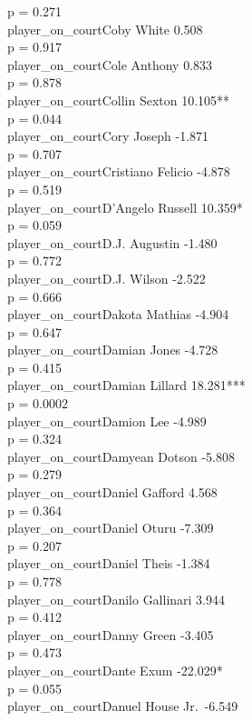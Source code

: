 \documentclass[
  landscape]{article}
\begin{document}
p = 0.271\\
player\_on\_courtCoby White 0.508\\
p = 0.917\\
player\_on\_courtCole Anthony 0.833\\
p = 0.878\\
player\_on\_courtCollin Sexton 10.105**\\
p = 0.044\\
player\_on\_courtCory Joseph -1.871\\
p = 0.707\\
player\_on\_courtCristiano Felicio -4.878\\
p = 0.519\\
player\_on\_courtD'Angelo Russell 10.359*\\
p = 0.059\\
player\_on\_courtD.J. Augustin -1.480\\
p = 0.772\\
player\_on\_courtD.J. Wilson -2.522\\
p = 0.666\\
player\_on\_courtDakota Mathias -4.904\\
p = 0.647\\
player\_on\_courtDamian Jones -4.728\\
p = 0.415\\
player\_on\_courtDamian Lillard 18.281***\\
p = 0.0002\\
player\_on\_courtDamion Lee -4.989\\
p = 0.324\\
player\_on\_courtDamyean Dotson -5.808\\
p = 0.279\\
player\_on\_courtDaniel Gafford 4.568\\
p = 0.364\\
player\_on\_courtDaniel Oturu -7.309\\
p = 0.207\\
player\_on\_courtDaniel Theis -1.384\\
p = 0.778\\
player\_on\_courtDanilo Gallinari 3.944\\
p = 0.412\\
player\_on\_courtDanny Green -3.405\\
p = 0.473\\
player\_on\_courtDante Exum -22.029*\\
p = 0.055\\
player\_on\_courtDanuel House Jr.~-6.549\\
\end{document}
